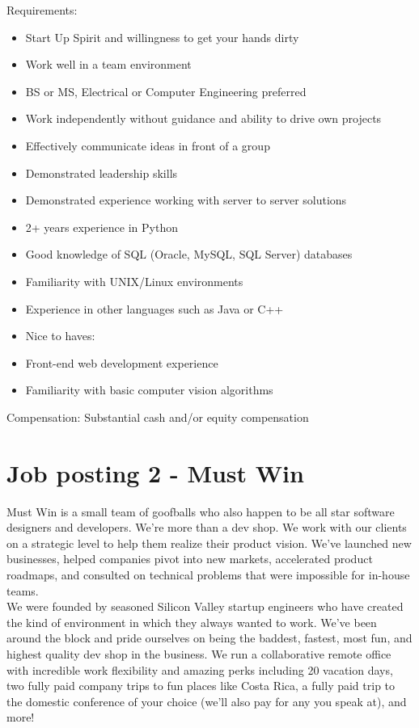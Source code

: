 Requirements:
\begin{itemize}
\item Start Up Spirit and willingness to get your hands dirty
\item Work well in a team environment
\item BS or MS, Electrical or Computer Engineering preferred
\item Work independently without guidance and ability to drive own projects
\item Effectively communicate ideas in front of a group
\item Demonstrated leadership skills
\item Demonstrated experience working with server to server solutions
\item 2+ years experience in Python
\item Good knowledge of SQL (Oracle, MySQL, SQL Server) databases
\item Familiarity with UNIX/Linux environments
\item Experience in other languages such as Java or C++
\item Nice to haves:
\item Front-end web development experience
\item Familiarity with basic computer vision algorithms
\end{itemize}

Compensation: Substantial cash and/or equity compensation

\section{Job posting 2 - Must Win}\label{sec:job-posting-two}
Must Win is a small team of goofballs who also happen to be all star software designers and developers. We're more than a dev shop. We work with our clients on a strategic level to help them realize their product vision. We've launched new businesses, helped companies pivot into new markets, accelerated product roadmaps, and consulted on technical problems that were impossible for in-house teams.\\

We were founded by seasoned Silicon Valley startup engineers who have created the kind of environment in which they always wanted to work. We've been around the block and pride ourselves on being the baddest, fastest, most fun, and highest quality dev shop in the business. We run a collaborative remote office with incredible work flexibility and amazing perks including 20 vacation days, two fully paid company trips to fun places like Costa Rica, a fully paid trip to the domestic conference of your choice (we'll also pay for any you speak at), and more!\\

